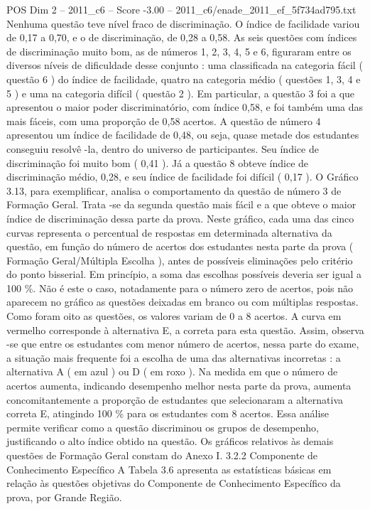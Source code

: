 \begin{textsample}{POS Dim 2 – 2011\_c6 – Score -3.00 – 2011\_c6/enade\_2011\_ef\_5f734ad795.txt}
Nenhuma questão teve nível fraco de discriminação.
O índice de facilidade variou de 0,17 a 0,70, e o de discriminação, de 0,28 a 0,58.
As seis questões com índices de discriminação muito bom, as de números 1, 2, 3, 4, 5 e 6, figuraram entre os diversos níveis de dificuldade desse conjunto : uma classificada na categoria fácil ( questão 6 ) do índice de facilidade, quatro na categoria médio ( questões 1, 3, 4 e 5 ) e uma na categoria difícil ( questão 2 ).
Em particular, a questão 3 foi a que apresentou o maior poder discriminatório, com índice 0,58, e foi também uma das mais fáceis, com uma proporção de 0,58 acertos.
A questão de número 4 apresentou um índice de facilidade de 0,48, ou seja, quase metade dos estudantes conseguiu resolvê -la, dentro do universo de participantes.
Seu índice de discriminação foi muito bom ( 0,41 ).
Já a questão 8 obteve índice de discriminação médio, 0,28, e seu índice de facilidade foi difícil ( 0,17 ).
O Gráfico 3.13, para exemplificar, analisa o comportamento da questão de número 3 de Formação Geral.
Trata -se da segunda questão mais fácil e a que obteve o maior índice de discriminação dessa parte da prova.
Neste gráfico, cada uma das cinco curvas representa o percentual de respostas em determinada alternativa da questão, em função do número de acertos dos estudantes nesta parte da prova ( Formação Geral/Múltipla Escolha ), antes de possíveis eliminações pelo critério do ponto bisserial.
Em princípio, a soma das escolhas possíveis deveria ser igual a 100 \%.
Não é este o caso, notadamente para o número zero de acertos, pois não aparecem no gráfico as questões deixadas em branco ou com múltiplas respostas.
Como foram oito as questões, os valores variam de 0 a 8 acertos.
A curva em vermelho corresponde à alternativa E, a correta para esta questão.
Assim, observa -se que entre os estudantes com menor número de acertos, nessa parte do exame, a situação mais frequente foi a escolha de uma das alternativas incorretas : a alternativa A ( em azul ) ou D ( em roxo ).
Na medida em que o número de acertos aumenta, indicando desempenho melhor nesta parte da prova, aumenta concomitantemente a proporção de estudantes que selecionaram a alternativa correta E, atingindo 100 \% para os estudantes com 8 acertos.
Essa análise permite verificar como a questão discriminou os grupos de desempenho, justificando o alto índice obtido na questão.
Os gráficos relativos às demais questões de Formação Geral constam do Anexo I. 3.2.2 Componente de Conhecimento Específico A Tabela 3.6 apresenta as estatísticas básicas em relação às questões objetivas do Componente de Conhecimento Específico da prova, por Grande Região.

\end{textsample}

